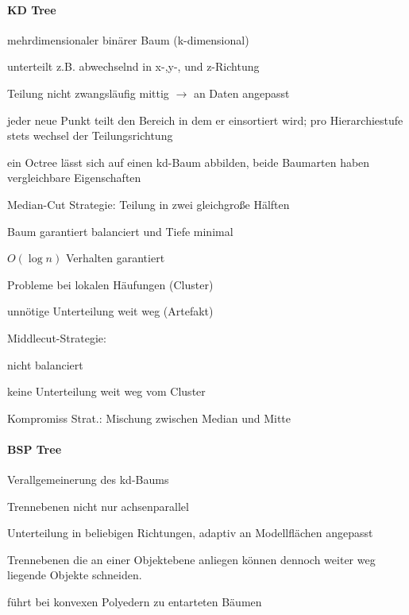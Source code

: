 \documentclass[landscape]{article}
\begin{document}
\begin{multicols}{3}
  \paragraph{KD Tree}
  \begin{itemize*}
    \item mehrdimensionaler binärer Baum (k-dimensional)
    \item unterteilt z.B. abwechselnd in x-,y-, und z-Richtung
    \item Teilung nicht zwangsläufig mittig $\rightarrow$ an Daten angepasst
    \item jeder neue Punkt teilt den Bereich in dem er einsortiert wird; pro Hierarchiestufe stets wechsel der Teilungsrichtung
    \item ein Octree lässt sich auf einen kd-Baum abbilden, beide Baumarten haben vergleichbare Eigenschaften
    \item Median-Cut Strategie: Teilung in zwei gleichgroße Hälften
    \begin{itemize*}
      \item Baum garantiert balanciert und Tiefe minimal
      \item $O(\log n)$ Verhalten garantiert
      \item Probleme bei lokalen Häufungen (Cluster)
      \item unnötige Unterteilung weit weg (Artefakt)
    \end{itemize*}
    \item Middlecut-Strategie:
    \begin{itemize*}
      \item nicht balanciert
      \item keine Unterteilung weit weg vom Cluster
    \end{itemize*}
    \item Kompromiss Strat.: Mischung zwischen Median und Mitte
  \end{itemize*}
  
  \paragraph{BSP Tree}
  \begin{itemize*}
    \item Verallgemeinerung des kd-Baums
    \item Trennebenen nicht nur achsenparallel
    \item Unterteilung in beliebigen Richtungen, adaptiv an Modellflächen angepasst
    \item Trennebenen die an einer Objektebene anliegen können dennoch weiter weg liegende Objekte schneiden.
    \item führt bei konvexen Polyedern zu entarteten Bäumen
  \end{itemize*}
  

\end{multicols}
\end{document}
